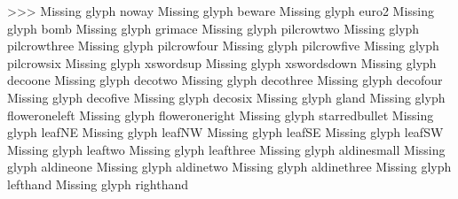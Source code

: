 {>>>
Missing glyph	noway
Missing glyph	beware
Missing glyph	euro2
Missing glyph	bomb
Missing glyph	grimace
Missing glyph	pilcrowtwo
Missing glyph	pilcrowthree
Missing glyph	pilcrowfour
Missing glyph	pilcrowfive
Missing glyph	pilcrowsix
Missing glyph	xswordsup
Missing glyph	xswordsdown
Missing glyph	decoone
Missing glyph	decotwo
Missing glyph	decothree
Missing glyph	decofour
Missing glyph	decofive
Missing glyph	decosix
Missing glyph	gland
Missing glyph	floweroneleft
Missing glyph	floweroneright
Missing glyph	starredbullet
Missing glyph	leafNE
Missing glyph	leafNW
Missing glyph	leafSE
Missing glyph	leafSW
Missing glyph	leaftwo
Missing glyph	leafthree
Missing glyph	aldinesmall
Missing glyph	aldineone
Missing glyph	aldinetwo
Missing glyph	aldinethree
Missing glyph	lefthand
Missing glyph	righthand

}
